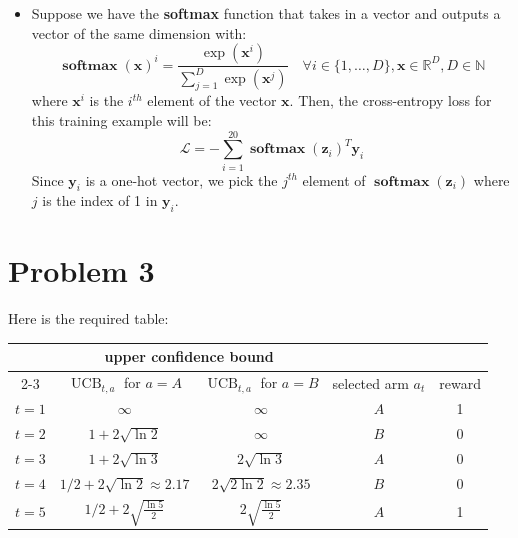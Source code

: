 \documentclass{article}
\newcommand{\mbi}[1]{\boldsymbol{#1}}
\DeclareMathOperator{\softmax}{\mathbf{softmax}}
\DeclareMathOperator{\UCB}{UCB}
\begin{document}
\begin{itemize}
\begin{itemize}
      \item[3)] Suppose we have the \textbf{softmax} function that takes in a vector and outputs a vector of the same dimension with:
      \[
        \softmax(\mbi{x})^i = \frac{\exp(\mbi{x}^i)}{\sum_{j=1}^D \exp(\mbi{x}^j)}
        \quad \forall i \in \{1, \ldots, D\}, \mbi{x} \in \mathbb{R}^D, D \in \mathbb{N}
      \]
      where $\mbi{x}^i$ is the $i^{th}$ element of the vector $\mbi{x}$.
      Then, the cross-entropy loss for this training example will be:
      \[ \mathcal{L} = -\sum_{i=1}^{20} \softmax(\mbi{z}_i)^T \mbi{y}_i \]
      Since $\mbi{y}_i$ is a one-hot vector, we pick the $j^{th}$ element of $\softmax(\mbi{z}_i)$ where $j$ is the index of 1 in $\mbi{y}_i$.
    \end{itemize}
  \end{itemize}

\section{Problem 3}
  Here is the required table:
  \begin{table}[h!]
    \centering
    \begin{tabular}{|c|c|c|c|c|}
      \hline
      & \multicolumn{2}{c|}{upper confidence bound} & & \\
      \cline{2-3}
      & $\UCB_{t,a}$ for $a = A$ & $\UCB_{t,a}$ for $a = B$ & selected arm $a_t$ & reward \\
      \hline
      $t=1$ & $\infty$ & $\infty$ & $A$ & 1 \\
      \hline
      $t=2$ & $1+2\sqrt{\ln2}$ & $\infty$ & $B$ & 0 \\
      \hline
      $t=3$ & $1+2\sqrt{\ln3}$ & $2\sqrt{\ln3}$ & $A$ & 0 \\
      \hline
      $t=4$ & $1/2+2\sqrt{\ln2} \approx 2.17$ & $2\sqrt{2\ln2} \approx 2.35$ & $B$ & 0 \\
      \hline
      $t=5$ & $1/2+2\sqrt{\frac{\ln5}{2}}$ & $2\sqrt{\frac{\ln5}{2}}$ & $A$ & 1 \\
      \hline
    \end{tabular}
  \end{table}
\end{document}
